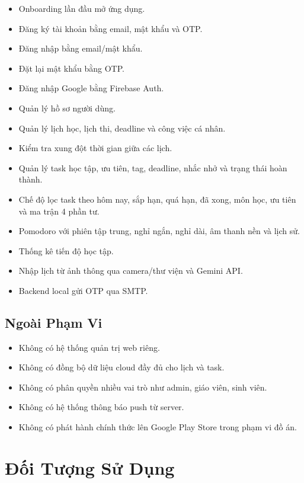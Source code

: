 \documentclass[12pt,a4paper]{report}
\begin{document}
\begin{itemize}
\item Onboarding lần đầu mở ứng dụng.
\item Đăng ký tài khoản bằng email, mật khẩu và OTP.
\item Đăng nhập bằng email/mật khẩu.
\item Đặt lại mật khẩu bằng OTP.
\item Đăng nhập Google bằng Firebase Auth.
\item Quản lý hồ sơ người dùng.
\item Quản lý lịch học, lịch thi, deadline và công việc cá nhân.
\item Kiểm tra xung đột thời gian giữa các lịch.
\item Quản lý task học tập, ưu tiên, tag, deadline, nhắc nhở và trạng thái hoàn thành.
\item Chế độ lọc task theo hôm nay, sắp hạn, quá hạn, đã xong, môn học, ưu tiên và ma trận 4 phần tư.
\item Pomodoro với phiên tập trung, nghỉ ngắn, nghỉ dài, âm thanh nền và lịch sử.
\item Thống kê tiến độ học tập.
\item Nhập lịch từ ảnh thông qua camera/thư viện và Gemini API.
\item Backend local gửi OTP qua SMTP.
\end{itemize}

\subsection{Ngoài Phạm Vi}

\begin{itemize}
\item Không có hệ thống quản trị web riêng.
\item Không có đồng bộ dữ liệu cloud đầy đủ cho lịch và task.
\item Không có phân quyền nhiều vai trò như admin, giáo viên, sinh viên.
\item Không có hệ thống thông báo push từ server.
\item Không có phát hành chính thức lên Google Play Store trong phạm vi đồ án.
\end{itemize}

\section{Đối Tượng Sử Dụng}
\end{document}
